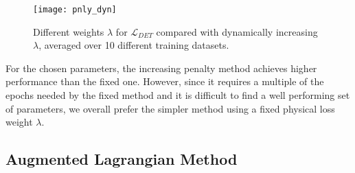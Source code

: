 \begin{figure}[H]
	\texttt{[image: pnly\_dyn]}
	\caption{Different weights $\lambda$ for $\mathcal{L}_{DET}$ compared with dynamically increasing $\lambda$, averaged over 10 different training datasets.}
	\label{fig:pnly_dyn}
\end{figure}

For the chosen parameters, the increasing penalty method achieves higher performance than the fixed one. However, since it requires a multiple of the epochs needed by the fixed method and it is difficult to find a well performing set of parameters, we overall prefer the simpler method using a fixed physical loss weight $\lambda$.

\subsection{Augmented Lagrangian Method}

